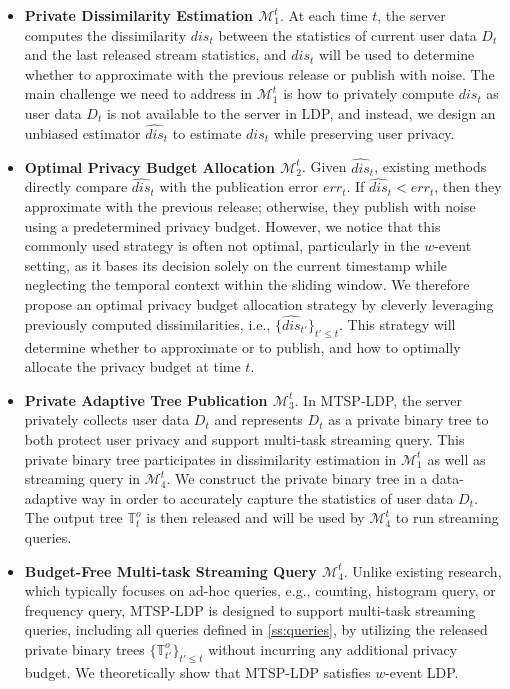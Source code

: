 \documentclass[acmsmall]{acmart}
\newcommand{\Tree}{\mathbb{T}}
\newcommand{\CM}{\mathcal{M}}
\newcommand{\OT}{\Tree^o}
\newcommand{\dis}{\mathit{dis}}
\newcommand{\hdis}{\hat{\mathit{dis}}}
\newcommand{\err}{\mathit{err}}
\begin{document}
\begin{itemize}
\item {\textbf{Private Dissimilarity Estimation $\CM_1^t$}}.
At each time $t$, the server computes the dissimilarity $\dis_t$ between the
statistics of current user data $D_t$ and the last released stream statistics,
and $\dis_t$ will be used to determine whether to approximate with the previous
release or publish with noise.
The main challenge we need to address in $\CM_1^t$ is how to privately compute
$\dis_t$ as user data $D_t$ is not available to the server in LDP, and instead,
we design an unbiased estimator $\hdis_t$ to estimate $\dis_t$ while preserving
user privacy.
\item {\textbf{Optimal Privacy Budget Allocation $\CM_2^t$}}.
Given $\hdis_t$, existing methods~\cite{Kellaris2014,Ren2022} directly compare
$\hdis_t$ with the publication error $\err_t$. If $\hdis_t < \err_t$, then they
approximate with the previous release; otherwise, they publish with noise using a
predetermined privacy budget.
However, we notice that this commonly used strategy is often not optimal,
particularly in the $w$-event setting, as it bases its decision solely on the
current timestamp while neglecting the temporal context within the sliding window.
We therefore propose an optimal privacy budget allocation strategy by cleverly leveraging
previously computed dissimilarities, i.e., $\{\hdis_{t'}\}_{t'\leq t}$.
This strategy will determine whether to approximate or to publish, and how to
optimally allocate the privacy budget at time $t$.

\item {\textbf{Private Adaptive Tree Publication $\CM_3^t$}}.
In MTSP-LDP, the server privately collects user data $D_t$ and represents $D_t$
as a private binary tree to both protect user privacy and support
multi-task streaming query.
This private binary tree participates in dissimilarity estimation in
$\CM_1^t$ as well as streaming query in $\CM_4^t$.
We construct the private binary tree in a data-adaptive way in order to
accurately capture the statistics of user data $D_t$.
The output tree $\OT_t$ is then released and will be used by $\CM_4^t$ to run
streaming queries.

\item {\textbf{Budget-Free Multi-task Streaming Query $\CM_4^t$}}.
Unlike existing research, which typically focuses on ad-hoc queries, e.g., counting, histogram query, or frequency query,
MTSP-LDP is designed to support multi-task streaming queries, including all
queries defined in \cref{ss:queries}, by utilizing the released private binary
trees $\{\OT_{t'}\}_{t'\leq t}$ without incurring  any additional privacy budget.
We theoretically show that MTSP-LDP satisfies $w$-event LDP.
\end{itemize}
\end{document}
